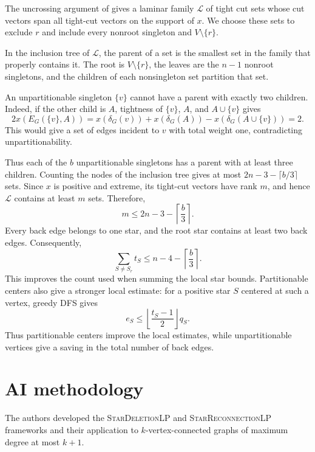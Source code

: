 \documentclass[11pt]{amsart}
\newcommand{\1}{\mathbbm{1}}
\newcommand{\LPone}{\textsc{StarDeletionLP}}
\newcommand{\LPtwo}{\textsc{StarReconnectionLP}}
\begin{document}
The uncrossing argument of
\cite{CornuejolsFonluptNaddef} gives a laminar family
$\mathcal L$ of tight cut sets whose cut vectors span all
tight-cut vectors on the support of $x$. We choose these
sets to exclude $r$ and include every nonroot singleton
and $V\setminus\{r\}$.

In the inclusion tree of $\mathcal L$, the parent of a set
is the smallest set in the family that properly contains it.
The root is $V\setminus\{r\}$, the leaves are the $n-1$
nonroot singletons, and the children of each nonsingleton
set partition that set.

An unpartitionable singleton $\{v\}$ cannot have a parent
with exactly two children. Indeed, if the other child is $A$,
tightness of $\{v\}$, $A$, and $A\cup\{v\}$ gives
\[
 2x(E_G(\{v\},A))
 =x(\delta_G(v))+x(\delta_G(A))
  -x(\delta_G(A\cup\{v\}))=2.
\]
This would give a set of edges incident to $v$ with total
weight one, contradicting unpartitionability.

Thus each of the $b$ unpartitionable singletons has a parent
with at least three children. Counting the nodes of the
inclusion tree gives at most $2n-3-\lceil b/3\rceil$ sets.
Since $x$ is positive and extreme, its tight-cut vectors
have rank $m$, and hence $\mathcal L$ contains at least
$m$ sets. Therefore,
\begin{equation}\label{eq:further-laminar-count}
 m\le2n-3-\left\lceil\frac b3\right\rceil.
\end{equation}
Every back edge belongs to one star, and the root star contains
at least two back edges. Consequently,
\begin{equation}\label{eq:further-back-count}
 \sum_{S\ne S_r}t_S
 \le n-4-\left\lceil\frac b3\right\rceil.
\end{equation}
This improves the count used when summing the local star bounds.
Partitionable centers also give a stronger local estimate: for a
positive star $S$ centered at such a vertex, greedy DFS gives
\[
 e_S\le\left\lfloor\frac{t_S-1}{2}\right\rfloor q_S.
\]
Thus partitionable centers improve the local estimates, while
unpartitionable vertices give a saving in the total number of
back edges.

\FloatBarrier

\section*{AI methodology}
\label{sec:ai-methodology}

The authors developed the \LPone{}
and \LPtwo{} frameworks and their application to
$k$-vertex-connected graphs of maximum degree at most $k+1$.
\end{document}
